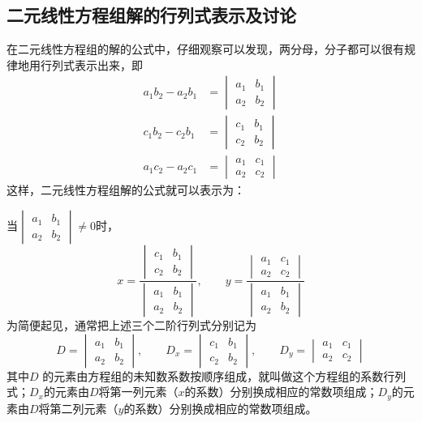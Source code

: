 \subsection{二元线性方程组解的行列式表示及讨论}

在二元线性方程组的解的公式中，仔细观察可以发现，两分母，分子都可以很有规律地用行列式表示出来，即
\[\begin{split}
    a_1b_2-a_2b_1&=\begin{vmatrix}
        a_1&b_1\\a_2&b_2
    \end{vmatrix}\\
    c_1b_2-c_2b_1&=\begin{vmatrix}
        c_1&b_1\\c_2&b_2
    \end{vmatrix}\\
    a_1c_2-a_2c_1&=\begin{vmatrix}
        a_1&c_1\\a_2&c_2
    \end{vmatrix} 
\end{split}\]
这样，二元线性方程组解的公式就可以表示为：

当$\begin{vmatrix}
    a_1&b_1\\a_2&b_2
\end{vmatrix}\ne 0$时，
\[x=\frac{\begin{vmatrix}
    c_1&b_1\\c_2&b_2
\end{vmatrix}}{\begin{vmatrix}
    a_1&b_1\\a_2&b_2
\end{vmatrix}},\qquad y=\frac{\begin{vmatrix}
    a_1&c_1\\a_2&c_2
\end{vmatrix}}{\begin{vmatrix}
    a_1&b_1\\a_2&b_2
\end{vmatrix}}\]
为简便起见，通常把上述三个二阶行列式分别记为
\[D=\begin{vmatrix}
    a_1&b_1\\a_2&b_2
\end{vmatrix},\qquad D_x=\begin{vmatrix}
    c_1&b_1\\c_2&b_2
\end{vmatrix},\qquad D_y=\begin{vmatrix}
    a_1&c_1\\a_2&c_2
\end{vmatrix}\]
其中$D$ 的元素由方程组的未知数系数按顺序组成，就叫做这个方程组的系数行列式；$D_x$的元素由$D$将第一列元素（$x$的系数）分别换成相应的常数项组成；$D_y$的元素由$D$将第二列元素（$y$的系数）分别换成相应的常数项组成。

